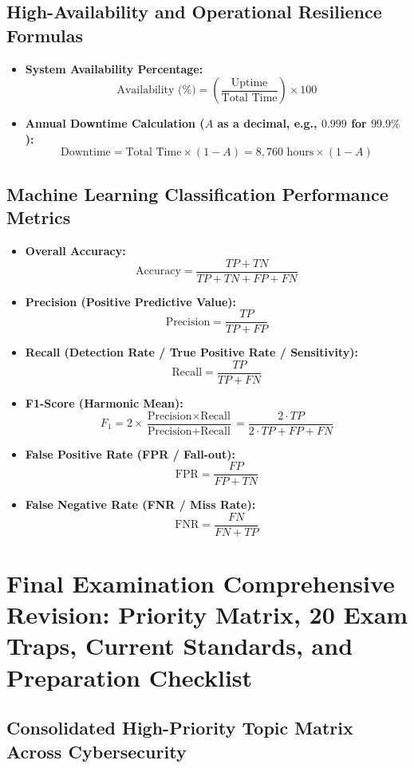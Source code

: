 \subsection{High-Availability and Operational Resilience Formulas}

\begin{itemize}
\item \textbf{System Availability Percentage:}
\[ \text{Availability (\%)} = \left( \frac{\text{Uptime}}{\text{Total Time}} \right) \times 100 \]
\item \textbf{Annual Downtime Calculation ($A$ as a decimal, e.g., $0.999$ for $99.9\%$):}
\[ \text{Downtime} = \text{Total Time} \times (1 - A) = 8,760\text{ hours} \times (1 - A) \]
\end{itemize}

\subsection{Machine Learning Classification Performance Metrics}

\begin{itemize}
\item \textbf{Overall Accuracy:}
\[ \text{Accuracy} = \frac{TP + TN}{TP + TN + FP + FN} \]
\item \textbf{Precision (Positive Predictive Value):}
\[ \text{Precision} = \frac{TP}{TP + FP} \]
\item \textbf{Recall (Detection Rate / True Positive Rate / Sensitivity):}
\[ \text{Recall} = \frac{TP}{TP + FN} \]
\item \textbf{F1-Score (Harmonic Mean):}
\[ F_1 = 2 \times \frac{\text{Precision} \times \text{Recall}}{\text{Precision} + \text{Recall}} = \frac{2 \cdot TP}{2 \cdot TP + FP + FN} \]
\item \textbf{False Positive Rate (FPR / Fall-out):}
\[ \text{FPR} = \frac{FP}{FP + TN} \]
\item \textbf{False Negative Rate (FNR / Miss Rate):}
\[ \text{FNR} = \frac{FN}{FN + TP} \]
\end{itemize}

\newpage
\section{Final Examination Comprehensive Revision: Priority Matrix, 20 Exam Traps, Current Standards, and Preparation Checklist}

\subsection{Consolidated High-Priority Topic Matrix Across Cybersecurity}

